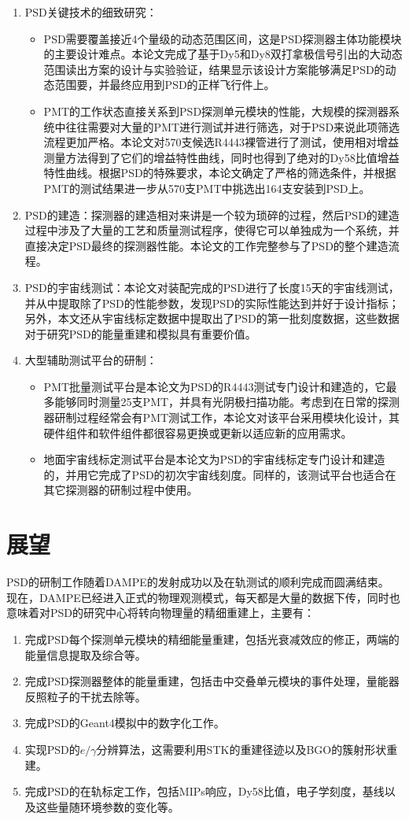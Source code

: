 \begin{enumerate}
	\item PSD关键技术的细致研究：
	\begin{itemize}
		\item PSD需要覆盖接近4个量级的动态范围区间，这是PSD探测器主体功能模块的主要设计难点。本论文完成了基于Dy5和Dy8双打拿极信号引出的大动态范围读出方案的设计与实验验证，结果显示该设计方案能够满足PSD的动态范围要，并最终应用到PSD的正样飞行件上。
		\item PMT的工作状态直接关系到PSD探测单元模块的性能，大规模的探测器系统中往往需要对大量的PMT进行测试并进行筛选，对于PSD来说此项筛选流程更加严格。本论文对570支候选R4443裸管进行了测试，使用相对增益测量方法得到了它们的增益特性曲线，同时也得到了绝对的Dy58比值增益特性曲线。根据PSD的特殊要求，本论文确定了严格的筛选条件，并根据PMT的测试结果进一步从570支PMT中挑选出164支安装到PSD上。
	\end{itemize}
	\item PSD的建造：探测器的建造相对来讲是一个较为琐碎的过程，然后PSD的建造过程中涉及了大量的工艺和质量测试程序，使得它可以单独成为一个系统，并直接决定PSD最终的探测器性能。本论文的工作完整参与了PSD的整个建造流程。
	\item PSD的宇宙线测试：本论文对装配完成的PSD进行了长度15天的宇宙线测试，并从中提取除了PSD的性能参数，发现PSD的实际性能达到并好于设计指标；另外，本文还从宇宙线标定数据中提取出了PSD的第一批刻度数据，这些数据对于研究PSD的能量重建和模拟具有重要价值。
	\item 大型辅助测试平台的研制：
	\begin{itemize}
		\item PMT批量测试平台是本论文为PSD的R4443测试专门设计和建造的，它最多能够同时测量25支PMT，并具有光阴极扫描功能。考虑到在日常的探测器研制过程经常会有PMT测试工作，本论文对该平台采用模块化设计，其硬件组件和软件组件都很容易更换或更新以适应新的应用需求。
		\item 地面宇宙线标定测试平台是本论文为PSD的宇宙线标定专门设计和建造的，并用它完成了PSD的初次宇宙线刻度。同样的，该测试平台也适合在其它探测器的研制过程中使用。
	\end{itemize}
\end{enumerate}

\section{展望}
PSD的研制工作随着DAMPE的发射成功以及在轨测试的顺利完成而圆满结束。
现在，DAMPE已经进入正式的物理观测模式，每天都是大量的数据下传，同时也意味着对PSD的研究中心将转向物理量的精细重建上，主要有：
\begin{enumerate}
	\item 完成PSD每个探测单元模块的精细能量重建，包括光衰减效应的修正，两端的能量信息提取及综合等。
	\item 完成PSD探测器整体的能量重建，包括击中交叠单元模块的事件处理，量能器反照粒子的干扰去除等。
	\item 完成PSD的Geant4模拟中的数字化工作。
	\item 实现PSD的$e/\gamma$分辨算法，这需要利用STK的重建径迹以及BGO的簇射形状重建。
	\item 完成PSD的在轨标定工作，包括MIPs响应，Dy58比值，电子学刻度，基线以及这些量随环境参数的变化等。
\end{enumerate}